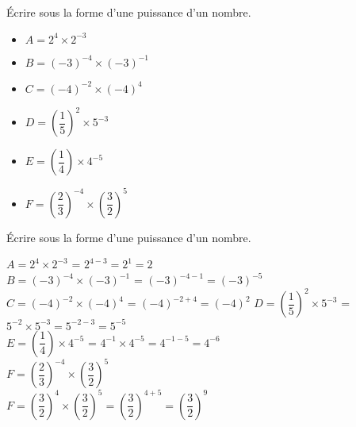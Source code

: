 \begin{exercice*}    
    Écrire sous la forme d'une puissance d'un nombre.
    \begin{changemargin}{0mm}{-10mm}
    \begin{multicols}{2}
        \begin{itemize}
            \item[] $A=2^4\times 2^{-3}$ \medskip
            \item[] $B=(-3)^{-4}\times (-3)^{-1}$ \medskip
            \item[] $C=(-4)^{-2}\times (-4)^4$ 
            \columnbreak
            \item[] $D=\left(\dfrac{1}{5}\right)^2\times 5^{-3}$\medskip
            \item[] $E=\left(\dfrac{1}{4}\right)\times 4^{-5}$\medskip
            \item[] $F=\left(\dfrac{2}{3}\right)^{-4}\times \left(\dfrac{3}{2}\right)^5$
        \end{itemize}
    \end{multicols}
    \end{changemargin}
\end{exercice*}
\begin{corrige}
    Écrire sous la forme d'une puissance d'un nombre.
        \begin{spacing}{2}
            $A=2^4\times 2^{-3}$                                                   {\red = $2^{4-3}=2^1=2$} \\
            $B=(-3)^{-4}\times (-3)^{-1}$                                          {\red = $(-3)^{-4-1}=(-3)^{-5}$} \\
            $C=(-4)^{-2}\times (-4)^4$                                             {\red = $(-4)^{-2+4}=(-4)^2$}                                                                        
            $D=\left(\dfrac{1}{5}\right)^2\times 5^{-3}$                           {\red = $5^{-2}\times 5^{-3}=5^{-2-3}=5^{-5}$}  \\
            $E=\left(\dfrac{1}{4}\right)\times 4^{-5}$                             {\red = $4^{-1}\times 4^{-5}=4^{-1-5}=4^{-6}$}  \\
            $F=\left(\dfrac{2}{3}\right)^{-4}\times \left(\dfrac{3}{2}\right)^5$   \\
            {\red $F=\left(\dfrac{3}{2}\right)^4\times \left(\dfrac{3}{2}\right)^5=\left(\dfrac{3}{2}\right)^{4+5}=\left(\dfrac{3}{2}\right)^9$}  
        \end{spacing}
\end{corrige}


